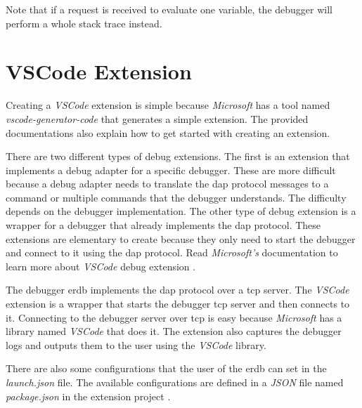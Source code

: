 Note that if a request is received to evaluate one variable, the debugger will perform a whole stack trace instead.



\section{VSCode Extension}
Creating a \emph{VSCode} extension is simple because \emph{Microsoft} has a tool named \emph{vscode-generator-code} \cite{vscode-generator-code} that generates a simple extension.
The provided documentations also explain how to get started with creating an extension.


There are two different types of debug extensions.
The first is an extension that implements a debug adapter for a specific debugger.
These are more difficult because a debug adapter needs to translate the \gls{dap} protocol messages to a command or multiple commands that the debugger understands.
The difficulty depends on the debugger implementation.
The other type of debug extension is a wrapper for a debugger that already implements the \gls{dap} protocol.
These extensions are elementary to create because they only need to start the debugger and connect to it using the \gls{dap} protocol.
Read \emph{Microsoft's} documentation to learn more about \emph{VSCode} debug extension \cite{vscode-debugger-extension-doc}.


The debugger \acrlong{erdb} implements the \gls{dap} protocol over a \gls{tcp} server.
The \emph{VSCode} extension is a wrapper that starts the debugger \gls{tcp} server and then connects to it.
Connecting to the debugger server over \gls{tcp} is easy because \emph{Microsoft} has a library named \emph{VSCode} that does it.
The extension also captures the debugger logs and outputs them to the user using the \emph{VSCode} library.


There are also some configurations that the user of the \gls{erdb} can set in the \emph{launch.json} file.
The available configurations are defined in a \emph{JSON} file named \emph{package.json} in the extension project \cite{erdb-vscode}.
